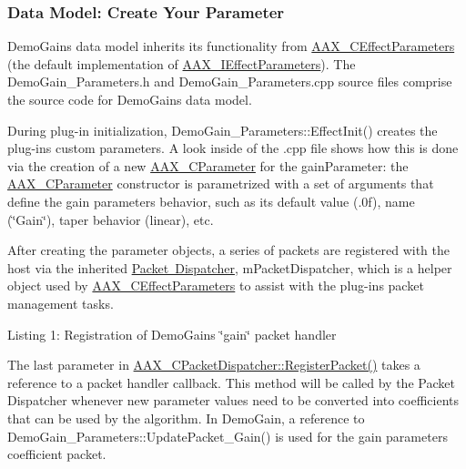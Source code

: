 \hypertarget{a00794_subsection__data_model_create_your_parameter}{}\subsubsection{Data Model\+: Create Your Parameter}\label{a00794_subsection__data_model_create_your_parameter}
Demo\+Gain\textquotesingle{}s data model inherits its functionality from \mbox{\hyperlink{a01481}{A\+A\+X\+\_\+\+C\+Effect\+Parameters}} (the default implementation of \mbox{\hyperlink{a01825}{A\+A\+X\+\_\+\+I\+Effect\+Parameters}}). The {\ttfamily Demo\+Gain\+\_\+\+Parameters.\+h} and {\ttfamily Demo\+Gain\+\_\+\+Parameters.\+cpp} source files comprise the source code for Demo\+Gain\textquotesingle{}s data model.

During plug-\/in initialization, {\ttfamily Demo\+Gain\+\_\+\+Parameters\+::\+Effect\+Init()} creates the plug-\/in\textquotesingle{}s custom parameters. A look inside of the .cpp file shows how this is done via the creation of a new \mbox{\hyperlink{a01537}{A\+A\+X\+\_\+\+C\+Parameter}} for the gain\+Parameter\+: the \mbox{\hyperlink{a01537}{A\+A\+X\+\_\+\+C\+Parameter}} constructor is parametrized with a set of arguments that define the gain parameter\textquotesingle{}s behavior, such as its default value ({.\+0f}), name (\char`\"{}\+Gain\char`\"{}), taper behavior (linear), etc.

After creating the parameter objects, a series of packets are registered with the host via the inherited \mbox{\hyperlink{a01529}{Packet Dispatcher}}, {\ttfamily m\+Packet\+Dispatcher}, which is a helper object used by \mbox{\hyperlink{a01481}{A\+A\+X\+\_\+\+C\+Effect\+Parameters}} to assist with the plug-\/in\textquotesingle{}s packet management tasks.


\begin{DoxyCode}{0}
\DoxyCodeLine{    \textcolor{keyword}{this},}
\end{DoxyCode}
  Listing 1\+: Registration of Demo\+Gain\textquotesingle{}s \char`\"{}gain\char`\"{} packet handler

The last parameter in \mbox{\hyperlink{a01529_a1848f0bfa473b54e9ee8e32872c89cb1}{A\+A\+X\+\_\+\+C\+Packet\+Dispatcher\+::\+Register\+Packet()}} takes a reference to a packet handler callback. This method will be called by the Packet Dispatcher whenever new parameter values need to be converted into coefficients that can be used by the algorithm. In Demo\+Gain, a reference to Demo\+Gain\+\_\+\+Parameters\+::\+Update\+Packet\+\_\+\+Gain() is used for the gain parameter\textquotesingle{}s coefficient packet.

